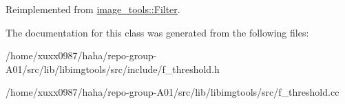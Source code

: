 Reimplemented from \hyperlink{classimage__tools_1_1Filter_afd5d1be5736e343077d331896d4130d9}{image\+\_\+tools\+::\+Filter}.



The documentation for this class was generated from the following files\+:\begin{DoxyCompactItemize}
\item 
/home/xuxx0987/haha/repo-\/group-\/\+A01/src/lib/libimgtools/src/include/f\+\_\+threshold.\+h\item 
/home/xuxx0987/haha/repo-\/group-\/\+A01/src/lib/libimgtools/src/f\+\_\+threshold.\+cc\end{DoxyCompactItemize}
